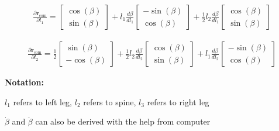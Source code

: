 \documentclass[10pt]{article}
\begin{document}
\begin{minipage}[t]{0.65\textwidth}
\begin{align*}
\frac{\partial \mathbf{r}_{\mathrm{com}}}{\partial l_1} =
\begin{bmatrix}
\cos(\beta) \\
\sin(\beta)
\end{bmatrix}
+
l_1 \frac{d\beta}{d l_1}
\begin{bmatrix}
- \sin(\beta) \\
\cos(\beta)
\end{bmatrix}
+
\frac{1}{2} l_2 \frac{d\beta}{d l_1}
\begin{bmatrix}
\cos(\beta) \\
\sin(\beta)
\end{bmatrix}
\end{align*}

\begin{align*}
\frac{\partial \mathbf{r}_{\mathrm{com}}}{\partial l_2} =
\frac{1}{2}
\begin{bmatrix}
\sin(\beta) \\
-\cos(\beta)
\end{bmatrix}
+
\frac{1}{2} l_2 \frac{d\beta}{d l_2}
\begin{bmatrix}
\cos(\beta) \\
\sin(\beta)
\end{bmatrix}
+
l_1\frac{d\beta}{d l_2}
\begin{bmatrix}
- \sin(\beta) \\
\cos(\beta)
\end{bmatrix}
\end{align*}

\end{minipage}
\hfill
\vrule width 0.4pt\relax
\hfill
\begin{minipage}[t]{0.3\textwidth}
\textbf{Notation:}

\(l_1\) refers to left leg, \(l_2\) refers to spine, \(l_3\) refers to right leg

\vspace{10em}
\(\dot{\beta}\) and \(\ddot{\beta}\) can also be derived with the help from computer

\end{minipage}

\newpage
\end{document}
